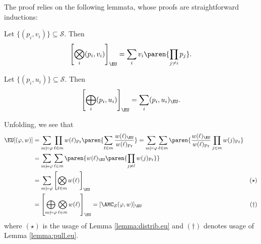 The proof relies on the following lemmata, 
whose proofs are straightforward inductions:

\begin{lemma}\label{lemma:distrib.eu}
  Let $\{(p_i, v_i)\}\subseteq \mathcal S$. Then
  \begin{equation*}
    \left[\bigotimes_i (p_i, v_i)\right]_{\EU} = \sum_{i} v_i\paren{\prod_{j \neq i} p_j}.
  \end{equation*} 
\end{lemma}

\begin{lemma}\label{lemma:pull.eu}
  Let $\{(p_i, u_i)\}\subseteq \mathcal S$. Then
  \begin{equation*}
    \left[\bigoplus_i (p_i, u_i)\right]_{\EU} = \sum_{i} (p_i, u_i)_{\EU}.
  \end{equation*} 
\end{lemma}

Unfolding, we see that
  \begin{align*}
    \EU[(\varphi, w)]
      &=\sum_{m \models \varphi} \prod_{\ell \in m} w(\ell)_{\Pr} \paren{\sum_{\ell \in m} \frac{w(\ell)_{\EU}}{w(\ell)_{\Pr}}} = \sum_{m \models \varphi}  \sum_{\ell \in m}\paren{ \frac{w(\ell)_{\EU}}{w(\ell)_{\Pr}}\prod_{j \in m} w(j)_{\Pr}}\\
      &=\sum_{m \models \varphi} \sum_{\ell \in m} \paren{ w(\ell)_{\EU}\paren{\prod_{j \neq \ell} w(j)_{\Pr}}}\\
      &=\sum_{m \models \varphi} \left[\bigotimes_{\ell \in m} w(\ell)\right]_{\EU}&(\star)\\&=\left[\bigoplus_{m \models \varphi} \bigotimes_{\ell \in m} w(\ell)\right]_{\EU} = [\AMC_{\mathcal S}(\varphi, w)]_{\EU}&(\dagger)
  \end{align*}
  where $(\star)$ is the usage of Lemma \ref{lemma:distrib.eu} and $(\dagger)$ denotes usage of Lemma \ref{lemma:pull.eu}.
